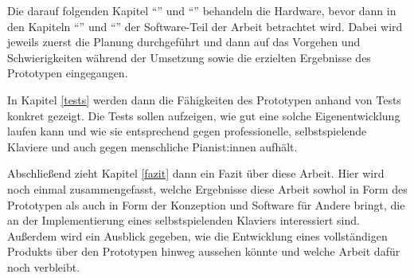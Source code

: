 Die darauf folgenden Kapitel \enquote{} und \enquote{} behandeln die Hardware, bevor dann in den Kapiteln \enquote{} und \enquote{} der Software-Teil der Arbeit betrachtet wird.
Dabei wird jeweils zuerst die Planung durchgeführt und dann auf das Vorgehen und Schwierigkeiten während der Umsetzung sowie die erzielten Ergebnisse des Prototypen eingegangen.

In Kapitel \ref{tests} werden dann die Fähigkeiten des Prototypen anhand von Tests konkret gezeigt.
Die Tests sollen aufzeigen, wie gut eine solche Eigenentwicklung laufen kann und wie sie entsprechend gegen professionelle, selbstspielende Klaviere und auch gegen menschliche Pianist:innen aufhält. %

Abschließend zieht Kapitel \ref{fazit} dann ein Fazit über diese Arbeit.
Hier wird noch einmal zusammengefasst, welche Ergebnisse diese Arbeit sowhol in Form des Prototypen als auch in Form der Konzeption und Software für Andere bringt, die an der Implementierung eines selbstspielenden Klaviers interessiert sind.
Außerdem wird ein Ausblick gegeben, wie die Entwicklung eines vollständigen Produkts über den Prototypen hinweg aussehen könnte und welche Arbeit dafür noch verbleibt.
